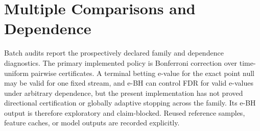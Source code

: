 \section{Multiple Comparisons and Dependence}

Batch audits report the prospectively declared family and dependence
diagnostics. The primary implemented policy is Bonferroni correction over
time-uniform pairwise certificates. A terminal betting e-value for the exact
point null may be valid for one fixed stream, and e-BH can control FDR for valid
e-values under arbitrary dependence, but the present implementation has not
proved directional certification or globally adaptive stopping across the
family. Its e-BH output is therefore exploratory and claim-blocked. Reused
reference samples, feature caches, or model outputs are recorded explicitly.
